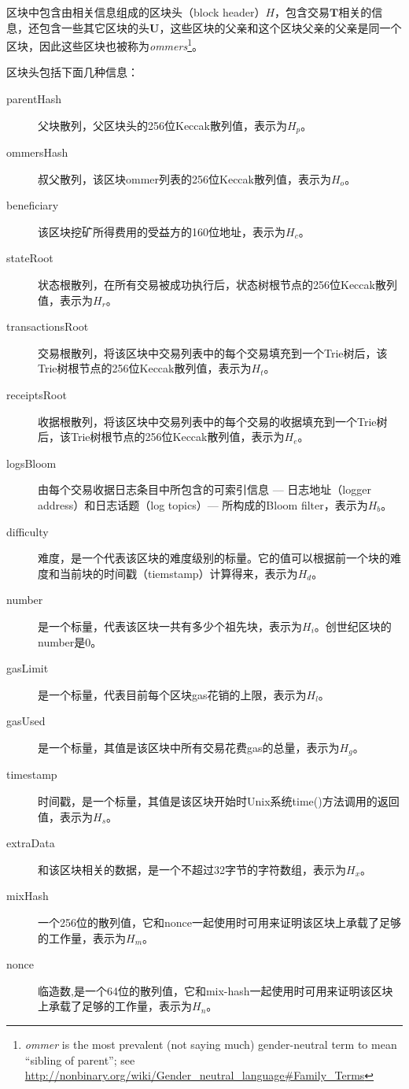 \documentclass[UTF8,nofonts]{ctexart}
\begin{document}
\begin{multicols}{2}
区块中包含由相关信息组成的区块头（block header）$H$，包含交易$\mathbf{T}$相关的信息，还包含一些其它区块的头$\mathbf{U}$，这些区块的父亲和这个区块父亲的父亲是同一个区块，因此这些区块也被称为\textit{ommers}\footnote{\textit{ommer} is the most prevalent (not saying much) gender-neutral term to mean ``sibling of parent''; see \url{http://nonbinary.org/wiki/Gender_neutral_language#Family_Terms}}。

区块头包括下面几种信息：


\begin{description}
\item[parentHash] 父块散列，父区块头的256位Keccak散列值，表示为$H_p$。
\item[ommersHash] 叔父散列，该区块ommer列表的256位Keccak散列值，表示为$H_o$。
\item[beneficiary] 该区块挖矿所得费用的受益方的160位地址，表示为$H_c$。
\item[stateRoot] 状态根散列，在所有交易被成功执行后，状态树根节点的256位Keccak散列值，表示为$H_r$。
\item[transactionsRoot] 交易根散列，将该区块中交易列表中的每个交易填充到一个Trie树后，该Trie树根节点的256位Keccak散列值，表示为$H_t$。
\item[receiptsRoot] 收据根散列，将该区块中交易列表中的每个交易的收据填充到一个Trie树后，该Trie树根节点的256位Keccak散列值，表示为$H_e$。
\item[logsBloom] 由每个交易收据日志条目中所包含的可索引信息 --- 日志地址（logger address）和日志话题（log topics）--- 所构成的Bloom filter，表示为$H_b$。
\item[difficulty] 难度，是一个代表该区块的难度级别的标量。它的值可以根据前一个块的难度和当前块的时间戳（tiemstamp）计算得来，表示为$H_d$。
\item[number] 是一个标量，代表该区块一共有多少个祖先块，表示为$H_i$。创世纪区块的number是0。
\item[gasLimit] 是一个标量，代表目前每个区块gas花销的上限，表示为$H_l$。
\item[gasUsed] 是一个标量，其值是该区块中所有交易花费gas的总量，表示为$H_g$。
\item[timestamp] 时间戳，是一个标量，其值是该区块开始时Unix系统time()方法调用的返回值，表示为$H_s$。
\item[extraData] 和该区块相关的数据，是一个不超过32字节的字符数组，表示为$H_x$。
\item[mixHash] 一个256位的散列值，它和nonce一起使用时可用来证明该区块上承载了足够的工作量，表示为$H_m$。
\item[nonce] 临造数,是一个64位的散列值，它和mix-hash一起使用时可用来证明该区块上承载了足够的工作量，表示为$H_n$。
\end{description}


\end{multicols}
\end{document}
